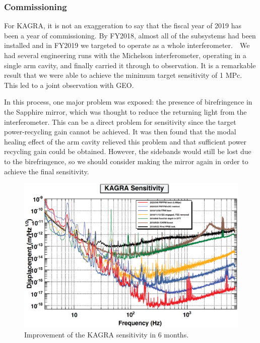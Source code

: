 
\vspace{10pt}
\subsubsection*{\bf Commissioning}
\vspace{3pt}

\vspace{3pt}

\vspace{3pt}

For KAGRA, it is not an exaggeration to say that the fiscal year of 2019 has been a year of commissioning. By FY2018, almost all of the subsystems had been installed and in FY2019 we targeted to operate as a whole interferometer.　We had several engineering runs with the Michelson interferometer, operating in a single arm cavity, and finally carried it through to observation. It is a remarkable result that we were able to achieve the minimum target sensitivity of 1 MPc. This led to a joint observation with GEO.

In this process, one major problem was exposed: the presence of birefringence in the Sapphire mirror, which was thought to reduce the returning light from the interferometer.  This can be a direct problem for sensitivity since the target power-recycling gain cannot be achieved. It was then found that the modal healing effect of the arm cavity relieved this problem and that sufficient power recycling gain could be obtained. However, the sidebands would still be lost due to the birefringence, so we should consider making the mirror again in order to achieve the final sensitivity.

\begin{figure}[htbp]
\begin{center}
\includegraphics[width=14cm]{astrodiv/gw/commissioning/sens_improve.eps}
\caption{Improvement of the KAGRA sensitivity in 6 months.}
\label{fig:sens_improve}
\end{center}
\end{figure}


